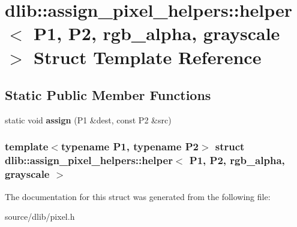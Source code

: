 \hypertarget{structdlib_1_1assign__pixel__helpers_1_1helper_3_01P1_00_01P2_00_01rgb__alpha_00_01grayscale_01_4}{
\section{dlib::assign\_\-pixel\_\-helpers::helper$<$ P1, P2, rgb\_\-alpha, grayscale $>$ Struct Template Reference}
\label{structdlib_1_1assign__pixel__helpers_1_1helper_3_01P1_00_01P2_00_01rgb__alpha_00_01grayscale_01_4}
}
\subsection*{Static Public Member Functions}
\begin{DoxyCompactItemize}
\item 
\hypertarget{structdlib_1_1assign__pixel__helpers_1_1helper_3_01P1_00_01P2_00_01rgb__alpha_00_01grayscale_01_4_a157c3684cf23a7497a5375be7acc18c1}{
static void {\bfseries assign} (P1 \&dest, const P2 \&src)}
\label{structdlib_1_1assign__pixel__helpers_1_1helper_3_01P1_00_01P2_00_01rgb__alpha_00_01grayscale_01_4_a157c3684cf23a7497a5375be7acc18c1}

\end{DoxyCompactItemize}
\subsubsection*{template$<$typename P1, typename P2$>$ struct dlib::assign\_\-pixel\_\-helpers::helper$<$ P1, P2, rgb\_\-alpha, grayscale $>$}



The documentation for this struct was generated from the following file:\begin{DoxyCompactItemize}
\item 
source/dlib/pixel.h\end{DoxyCompactItemize}
